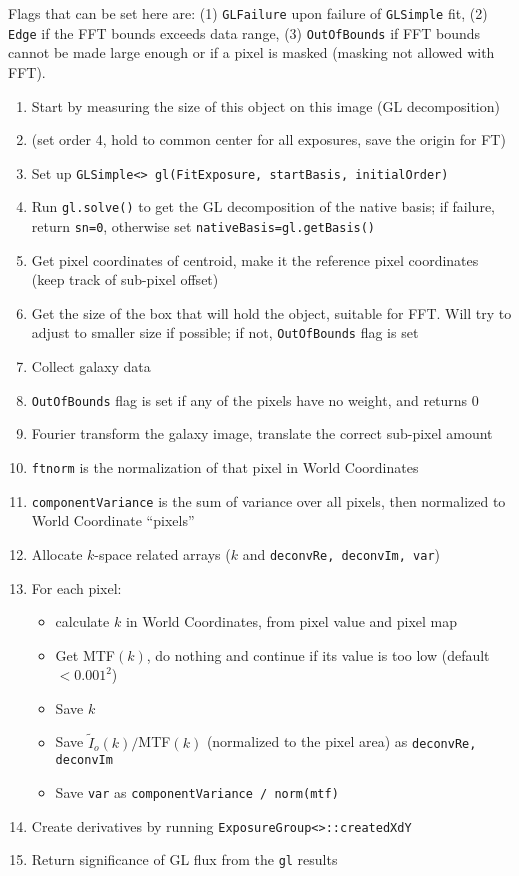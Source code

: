 \documentclass[useAMS,usenatbib,usegraphicx]{mn2e}
\begin{document}
Flags that can be set here are: (1) {\tt GLFailure} upon failure of {\tt GLSimple} fit,
(2) {\tt Edge} if the FFT bounds exceeds data range, (3) {\tt OutOfBounds} if FFT bounds cannot 
be made large enough or if a pixel is masked (masking not allowed with FFT).
\begin{enumerate}
\item Start by measuring the size of this object on this image (GL decomposition)
\item (set order 4, hold to common center for all exposures, save the origin for FT)
\item Set up {\tt GLSimple<> gl(FitExposure, startBasis, initialOrder)}
\item Run {\tt gl.solve()} to get the GL decomposition of the native basis; 
if failure, return {\tt sn=0}, otherwise set {\tt nativeBasis=gl.getBasis()}
\item Get pixel coordinates of centroid, make it the reference pixel coordinates (keep track of 
sub-pixel offset)
\item Get the size of the box that will hold the object, suitable for FFT.  Will try to adjust to 
smaller size if possible; if not, {\tt OutOfBounds} flag is set
\item Collect galaxy data
\item {\tt OutOfBounds} flag is set if any of the pixels have no weight, and returns 0
\item Fourier transform the galaxy image, translate the correct sub-pixel amount
\item {\tt ftnorm} is the normalization of that pixel in World Coordinates
\item {\tt componentVariance} is the sum of variance over all pixels, then normalized to World 
Coordinate ``pixels''
\item Allocate $k$-space related arrays ($k$ and {\tt deconvRe, deconvIm, var})
\item For each pixel:
\begin{itemize}
  \item calculate $k$ in World Coordinates, from pixel value and pixel map
  \item Get MTF$(k)$, do nothing and continue if its value is too low (default $<0.001^2$)
  \item Save $k$
  \item Save $\tilde{I}_o(k)/$MTF$(k)$ (normalized to the pixel area) as {\tt deconvRe, deconvIm}
  \item Save {\tt var} as {\tt componentVariance / norm(mtf)}
\end{itemize}
\item Create derivatives by running {\tt ExposureGroup<>::createdXdY}
\item Return significance of GL flux from the {\tt gl} results
\end{enumerate}
\end{document}
